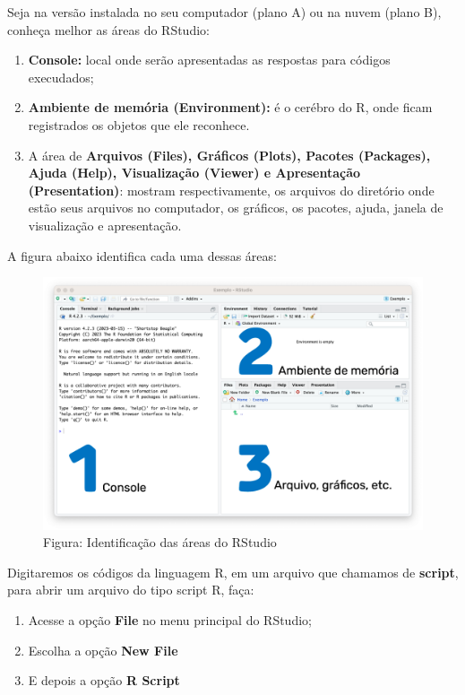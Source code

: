 \documentclass[
]{book}
\begin{document}
Seja na versão instalada no seu computador (plano A) ou na nuvem (plano B), conheça melhor as áreas do RStudio:

\begin{enumerate}
\def\labelenumi{\arabic{enumi}.}
\item
  \textbf{Console:} local onde serão apresentadas as respostas para códigos execudados;
\item
  \textbf{Ambiente de memória (Environment):} é o cerébro do R, onde ficam registrados os objetos que ele reconhece.
\item
  A área de \textbf{Arquivos (Files), Gráficos (Plots), Pacotes (Packages), Ajuda (Help), Visualização (Viewer) e Apresentação (Presentation)}: mostram respectivamente, os arquivos do diretório onde estão seus arquivos no computador, os gráficos, os pacotes, ajuda, janela de visualização e apresentação.
\end{enumerate}

A figura abaixo identifica cada uma dessas áreas:

\begin{figure}
\centering
\includegraphics{telaRStudio123.png}
\caption{Figura: Identificação das áreas do RStudio}
\end{figure}

Digitaremos os códigos da linguagem R, em um arquivo que chamamos de \textbf{script}, para abrir um arquivo do tipo script R, faça:

\begin{enumerate}
\def\labelenumi{\arabic{enumi}.}
\item
  Acesse a opção \textbf{File} no menu principal do RStudio;
\item
  Escolha a opção \textbf{New File}
\item
  E depois a opção \textbf{R Script}
\end{enumerate}
\end{document}
